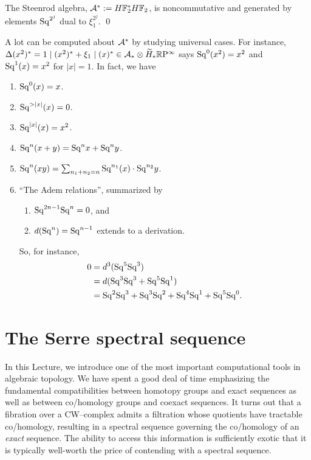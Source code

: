\begin{corollary}
The Steenrod algebra, $\mathcal A^* := H\mathbb F_2^* H\mathbb F_2$, is noncommutative and generated by elements $\mathrm{Sq}^{2^j}$ dual to $\xi_1^{2^j}$.
\qed
\end{corollary}

\begin{remark}
A lot can be computed about $\mathcal A^*$ by studying universal cases.
For instance, $\Delta(x^2)^* = 1 \mid (x^2)^* + \xi_1 \mid (x)^* \in \mathcal A_* \otimes \widetilde H_* \mathbb R \mathrm{P}^\infty$ says $\mathrm{Sq}^0(x^2) = x^2$ and $\mathrm{Sq}^1(x) = x^2$ for $|x| = 1$.
In fact, we have
\begin{enumerate}
    \item $\mathrm{Sq}^0(x) = x$.
    \item $\mathrm{Sq}^{>|x|}(x) = 0$.
    \item $\mathrm{Sq}^{|x|}(x) = x^2$.
    \item $\mathrm{Sq}^n(x+y) = \mathrm{Sq}^n x + \mathrm{Sq}^n y$.
    \item $\mathrm{Sq}^n(xy) = \sum_{n_1 + n_2 = n} \mathrm{Sq}^{n_1}(x) \cdot \mathrm{Sq}^{n_2} y$.
    \item ``The Adem relations'', summarized by
    \begin{enumerate}
        \item $\mathrm{Sq}^{2n-1} \mathrm{Sq}^n = 0$, and
        \item $d(\mathrm{Sq}^n) = \mathrm{Sq}^{n-1}$ extends to a derivation.
    \end{enumerate}
    So, for instance,
    \begin{align*}
    0 & = d^3(\mathrm{Sq}^5 \mathrm{Sq}^3) \\
    & = d(\mathrm{Sq}^3\mathrm{Sq}^3 + \mathrm{Sq}^5 \mathrm{Sq}^1) \\
    & = \mathrm{Sq}^2 \mathrm{Sq}^3 + \mathrm{Sq}^3 \mathrm{Sq}^2 + \mathrm{Sq}^4 \mathrm{Sq}^1 + \mathrm{Sq}^5 \mathrm{Sq}^0.
    \end{align*}
\end{enumerate}
\end{remark}




\section{The Serre spectral sequence}

In this Lecture, we introduce one of the most important computational tools in algebraic topology.
We have spent a good deal of time emphasizing the fundamental compatibilities between homotopy groups and exact sequences as well as between co/homology groups and coexact sequences.
It turns out that a fibration over a CW--complex admits a filtration whose quotients have tractable co/homology, resulting in a spectral sequence governing the co/homology of an \emph{exact} sequence.
The ability to access this information is sufficiently exotic that it is typically well-worth the price of contending with a spectral sequence.

